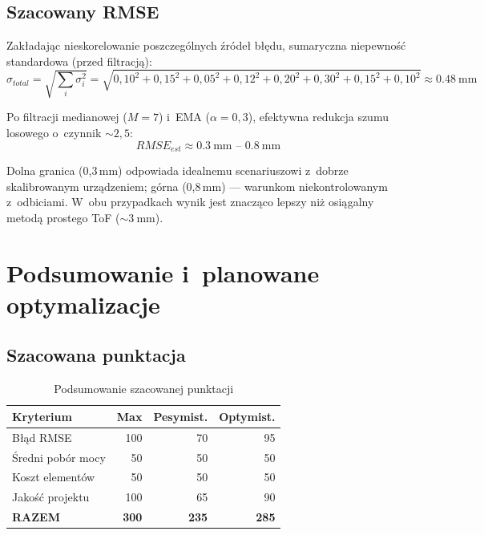 \documentclass[a4paper,11pt]{article}
\begin{document}
\subsection{Szacowany RMSE}

Zakładając nieskorelowanie poszczególnych źródeł błędu, sumaryczna
niepewność standardowa (przed filtracją):
\begin{equation}
    \sigma_{total} = \sqrt{\sum_i \sigma_i^2}
    = \sqrt{0{,}10^2 + 0{,}15^2 + 0{,}05^2 + 0{,}12^2 + 0{,}20^2 + 0{,}30^2 + 0{,}15^2 + 0{,}10^2}
    \approx \SI{0,48}{\milli\metre}
    \label{eq:sigma_total}
\end{equation}

Po filtracji medianowej ($M = 7$) i~EMA ($\alpha = 0{,}3$), efektywna
redukcja szumu losowego o~czynnik ${\sim}2{,}5$:
\begin{equation}
    \boxed{RMSE_{est} \approx \SI{0,3}{\milli\metre} \text{ -- } \SI{0,8}{\milli\metre}}
    \label{eq:rmse_final}
\end{equation}

Dolna granica (0,3\,mm) odpowiada idealnemu scenariuszowi z~dobrze
skalibrowanym urządzeniem; górna (0,8\,mm) --- warunkom niekontrolowanym
z~odbiciami. W~obu przypadkach wynik jest znacząco lepszy niż osiągalny
metodą prostego ToF (${\sim}\SI{3}{\milli\metre}$).


\section{Podsumowanie i~planowane optymalizacje}
\label{sec:podsumowanie}

\subsection{Szacowana punktacja}

\begin{table}[H]
    \centering
    \caption{Podsumowanie szacowanej punktacji}
    \label{tab:punktacja}
    \begin{tabular}{lrrr}
        \toprule
        \textbf{Kryterium} & \textbf{Max} & \textbf{Pesymist.} & \textbf{Optymist.} \\
        \midrule
        Błąd RMSE         & 100 & 70  & 95 \\
        Średni pobór mocy & 50  & 50  & 50 \\
        Koszt elementów   & 50  & 50  & 50 \\
        Jakość projektu   & 100 & 65  & 90 \\
        \midrule
        \textbf{RAZEM}    & \textbf{300} & \textbf{235} & \textbf{285} \\
        \bottomrule
    \end{tabular}
\end{table}
\end{document}
